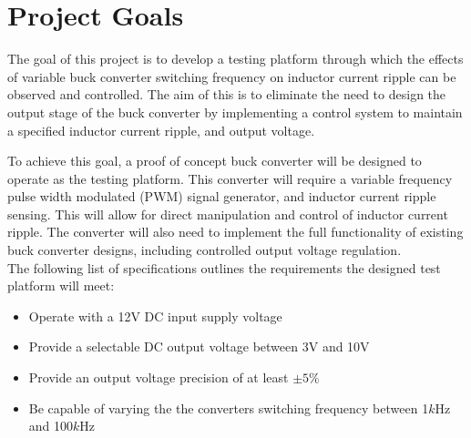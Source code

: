 \section{Project Goals}\label{S:goals}

The goal of this project is to develop a testing platform through which the effects of variable buck converter switching frequency on inductor current ripple can be observed and controlled. The aim of this is to eliminate the need to design the output stage of the buck converter by implementing a control system to maintain a specified inductor current ripple, and output voltage.

To achieve this goal, a proof of concept buck converter will be designed to operate as the testing platform. This converter will require a variable frequency pulse width modulated (PWM) signal generator, and inductor current ripple sensing. This will allow for direct manipulation and control of inductor current ripple. The converter will also need to implement the full functionality of existing buck converter designs, including controlled output voltage regulation.\\

The following list of specifications outlines the requirements the designed test platform will meet:

\begin{itemize}
    \item Operate with a 12V DC input supply voltage
    \item Provide a selectable DC output voltage between 3V and 10V
    \item Provide an output voltage precision of at least $\pm5\%$
    \item Be capable of varying the the converters switching frequency between 1$k$Hz and 100$k$Hz
\end{itemize}




